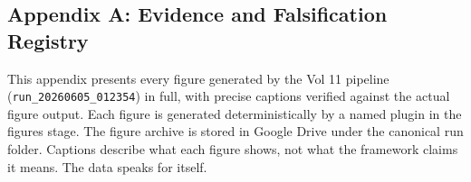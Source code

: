 \documentclass[11pt, letterpaper, openany]{book}
\begin{document}
\begin{empiricalbox}
\clearpage
%
%

\chapter*{Appendix A: Evidence and Falsification Registry}

This appendix presents every figure generated by the Vol 11 pipeline
(\texttt{run\_20260605\_012354}) in full, with precise captions verified
against the actual figure output. Each figure is generated deterministically
by a named plugin in the figures stage. The figure archive is stored in
Google Drive under the canonical run folder. Captions describe what each
figure shows, not what the framework claims it means. The data speaks for
itself.



\end{empiricalbox}
\end{document}
